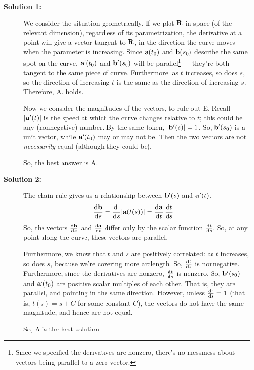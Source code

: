 \begin{solution}
\begin{description}
\item[\textbf{Solution 1:}]
We consider the situation geometrically. If we plot $\mathbf{R}$ in space (of the relevant dimension), regardless of its parametrization, the derivative at a point will give a vector tangent to $\mathbf{R}$, in the direction the curve moves when the parameter is increasing. Since $\mathbf{a}(t_0)$ and $\mathbf{b}(s_0)$ describe the same spot on the curve, $\mathbf{a}'(t_0)$ and $\mathbf{b}'(s_0)$ will be parallel\footnote{Since we specified the derivatives are nonzero, there's no messiness about vectors being parallel to a zero vector.} --- they're both tangent to the same piece of curve. Furthermore, as $t$ increases, so does $s$, so the direction of increasing $t$ is the same as the direction of increasing $s$. Therefore, A. holds.
\begin{center}
\end{center}
Now we consider the magnitudes of the vectors, to rule out E. Recall $|\mathbf{a}'(t)|$ is the speed at which the curve changes relative to $t$; this could be any (nonnegative) number. By the same token, $ |\mathbf{b}'(s)|=1$. So, $\mathbf{b}'(s_0)$ is a unit vector, while $\mathbf{a}'(t_0)$ may or may not be. Then the two vectors are not \emph{necessarily} equal (although they could be).

So, the best answer is A. 
\item[\textbf{Solution 2:}] The chain rule gives us a relationship between $\mathbf{b}'(s)$ and $\mathbf{a}'(t)$.
\begin{align*}
\diff{\vb}{s}&=\diff{}{s}[\va(t(s))]=\diff{\va}{t}\,\diff{t}{s}
\end{align*}
So, the vectors $\diff{\vb}{s}$ and $\diff{\va}{t}$ differ only by the scalar function $\diff{t}{s}$. So, at any point along the curve, these vectors are parallel.

Furthermore, we know that $t$ and $s$ are positively correlated: as $t$ increases, so does $s$, because we're covering more arclength. So, $\diff{t}{s}$ is nonnegative. Furthermore, since the derivatives are nonzero, $\diff{t}{s}$ is nonzero. So, $\mathbf{b}'(s_0)$ and $\mathbf{a}'(t_0)$ are positive scalar multiples of each other. That is, they are parallel, and pointing in the same direction. However, unless $\diff{t}{s}=1$ (that is, $t(s)=s+C$ for some constant $C$), the vectors do not have the same magnitude, and hence are not equal.

So, A is the best solution. 
\end{description}
\end{solution}

